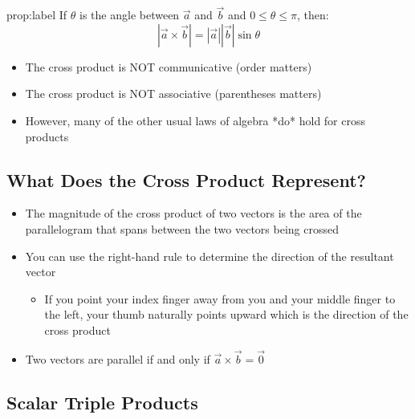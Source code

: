\documentclass{package/notes}
\begin{document}
\begin{proposition}{prop:label}
	If $\theta$ is the angle between $\vec a$ and $\vec b$ and $0\le\theta\le\pi$, then:
	$$|\vec a \times \vec b | = |\vec a||\vec b| \sin\theta$$
\end{proposition}

\begin{itemize}
	\item The cross product is NOT communicative (order matters)
	\item The cross product is NOT associative (parentheses matters)
	\item However, many of the other usual laws of algebra *do* hold for cross products
\end{itemize}

\subsection{What Does the Cross Product Represent?}

\begin{itemize}
	\item The magnitude of the cross product of two vectors is the area of the parallelogram that spans between the two vectors being crossed
	\item You can use the right-hand rule to determine the direction of the resultant vector
	\begin{itemize}
		\item If you point your index finger away from you and your middle finger to the left, your thumb  naturally points upward which is the direction of the cross product
	\end{itemize}
	\item Two vectors are parallel if and only if $\vec a \times \vec b = \vec 0$ 
\end{itemize}

\subsection{Scalar Triple Products}
\end{document}
